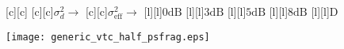\documentclass{article}
\begin{document}
\begin{figure}[htb]
  \begin{center}

        [c][c]{}
        [c][c]{$\sigma_d^2 \rightarrow$}
        [c][c]{$\sigma_{\mathrm{eff}}^2 \rightarrow$}
        [l][l]{$\mathrm{0dB}$}
        [l][l]{$\mathrm{3dB}$}
	[l]{$\mathrm{5dB}$}
	[l]{$\mathrm{8dB}$}
        [l][l]{$\mathrm{D}$}       

    \texttt{[image: generic\_vtc\_half\_psfrag.eps]}
    \end{center}
\end{figure}
\end{document}
